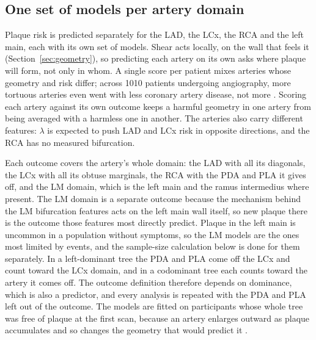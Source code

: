 \subsection{One set of models per artery domain}
\label{sec:risk-domains}

Plaque risk is predicted separately for the LAD, the LCx, the RCA and the left main, each with its own set of models.
Shear acts locally, on the wall that feels it (Section~\ref{sec:geometry}), so predicting each artery on its own asks where plaque will form, not only in whom.
A single score per patient mixes arteries whose geometry and risk differ; across 1010 patients undergoing angiography, more tortuous arteries even went with less coronary artery disease, not more \cite{li2011tortuosity}.
Scoring each artery against its own outcome keeps a harmful geometry in one artery from being averaged with a harmless one in another.
The arteries also carry different features: $\lambda$ is expected to push LAD and LCx risk in opposite directions, and the RCA has no measured bifurcation.

Each outcome covers the artery's whole domain: the LAD with all its diagonals, the LCx with all its obtuse marginals, the RCA with the PDA and PLA it gives off, and the LM domain, which is the left main and the ramus intermedius where present.
The LM domain is a separate outcome because the mechanism behind the LM bifurcation features acts on the left main wall itself, so new plaque there is the outcome those features most directly predict.
Plaque in the left main is uncommon in a population without symptoms, so the LM models are the ones most limited by events, and the sample-size calculation below is done for them separately.
In a left-dominant tree the PDA and PLA come off the LCx and count toward the LCx domain, and in a codominant tree each counts toward the artery it comes off.
The outcome definition therefore depends on dominance, which is also a predictor, and every analysis is repeated with the PDA and PLA left out of the outcome.
The models are fitted on participants whose whole tree was free of plaque at the first scan, because an artery enlarges outward as plaque accumulates and so changes the geometry that would predict it \cite{glagov1987remodeling}.

